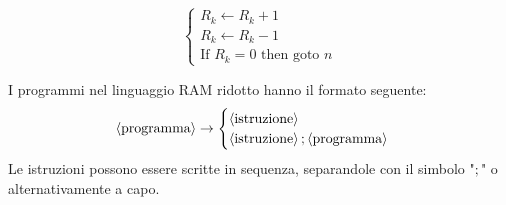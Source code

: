 \documentclass{lectures}
\begin{document}
\begin{multicols}{2}
\begin{definition}
\[\begin{cases}
        R_k \leftarrow R_k + 1\\
        R_k \leftarrow R_k - 1\\
        \text{If }R_k=0\text{ then goto }n
    \end{cases}
    \]
\end{definition}
\begin{definition}
    I programmi nel linguaggio RAM ridotto hanno il formato seguente:
    \[\left\langle\text{programma}\right\rangle \rightarrow \begin{cases}
        \left\langle\text{istruzione}\right\rangle\\
        \left\langle\text{istruzione}\right\rangle;\left\langle\text{programma}\right\rangle
    \end{cases}
    \]
    Le istruzioni possono essere scritte in sequenza, separandole con il simbolo "\(;\)" o alternativamente a capo.
    

\end{definition}
\end{multicols}
\end{document}
